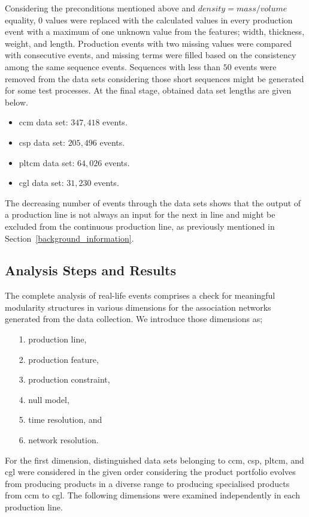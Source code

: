 Considering the preconditions mentioned above and $density = mass/volume$ equality, $0$ values were replaced with the calculated values in every production event with a maximum of one unknown value from the features; width, thickness, weight, and length. Production events with two missing values were compared with consecutive events, and missing terms were filled based on the consistency among the same sequence events. Sequences with less than $50$ events were removed from the data sets considering those short sequences might be generated for some test processes. At the final stage, obtained data set lengths are given below.
\begin{itemize}
	\item \acs{ccm} data set: $347,418$ events.
	\item \acs{csp} data set: $205,496$ events.
	\item \acs{pltcm} data set: $64,026$ events.
	\item \acs{cgl} data set: $31,230$ events.
\end{itemize}
The decreasing number of events through the data sets shows that the output of a production line is not always an input for the next in line and might be excluded from the continuous production line, as previously mentioned in Section~\ref{background_information}.

\subsection{Analysis Steps and Results}

The complete analysis of real-life events comprises a check for meaningful modularity structures in various dimensions for the association networks generated from the data collection. We introduce those dimensions as;
\begin{itemize}
	\item[1.] production line,
	\item[2.] production feature,
	\item[3.] production constraint,
	\item[4.] null model,
	\item[5.] time resolution, and
	\item[6.] network resolution.
\end{itemize} 
For the first dimension, distinguished data sets belonging to \acs{ccm}, \acs{csp}, \acs{pltcm}, and \acs{cgl} were considered in the given order considering the product portfolio evolves from producing products in a diverse range to producing specialised products from \acs{ccm} to \acs{cgl}. The following dimensions were examined independently in each production line.


